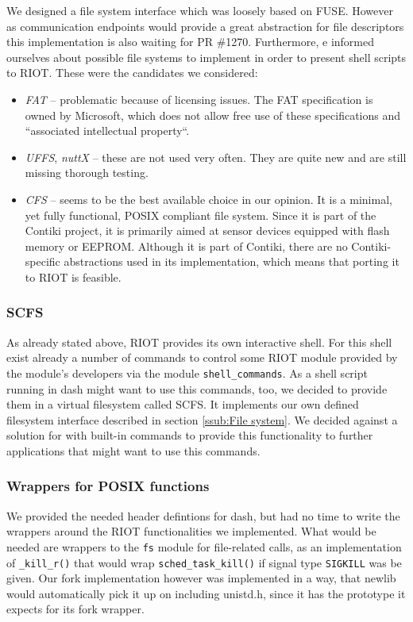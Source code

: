 \documentclass[conference]{IEEEtran}
\begin{document}
We designed a file system interface which was loosely based on
FUSE\cite{fuse}. However as communication endpoints would provide a great
abstraction for file descriptors this implementation is also waiting for
PR \#1270. Furthermore, e informed ourselves about possible file systems to
implement in order to present shell scripts to RIOT. These were the
candidates we considered:

\begin{itemize}
  \item \emph{FAT}\cite{fat} -- problematic because of licensing issues. The FAT
    specification is owned by Microsoft, which does not allow free use
    of these specifications and ``associated intellectual
    property``\cite{fatlicense}.
  \item \emph{UFFS}\cite{uffs}, \emph{nuttX}\cite{nuttx} -- these are
    not used very often. They are quite new and are still missing
    thorough testing.
  \item \emph{CFS}\cite{cfs} -- seems to be the best available choice in
    our opinion. It is a minimal, yet fully functional, POSIX compliant
    file system. Since it is part of the Contiki project\cite{contiki},
    it is primarily aimed at sensor devices equipped with flash memory
    or EEPROM. Although it is part of Contiki, there are no
    Contiki-specific abstractions used in its implementation, which
    means that porting it to RIOT is feasible.
\end{itemize}

\subsubsection{SCFS}
\label{ssub:SCFS}
As already stated above, RIOT provides its own interactive shell. For this
shell exist already a number of commands to control some RIOT module provided 
by the module's developers via the module \texttt{shell\_commands}. As a shell
script running in dash might want to use this commands, too, we decided to 
provide them in a virtual filesystem called SCFS. It implements our own defined
filesystem interface described in section \ref{ssub:File system}. We decided
against a solution for with built-in commands to provide this functionality
to further applications that might want to use this commands.

\subsubsection{Wrappers for POSIX functions}
\label{ssub:Wrappers for POSIX functions}
We provided the needed header defintions for dash, but had no time to write
the wrappers around the RIOT functionalities we implemented. What would be
needed are wrappers to the \texttt{fs} module for file-related calls, as an 
implementation of \texttt{\_kill\_r()} that would wrap
\texttt{sched\_task\_kill()} if signal type \texttt{SIGKILL} was be given.
Our fork implementation however was implemented in a way, that newlib would
automatically pick it up on including unistd.h, since it has the
prototype it expects for its fork wrapper.
\end{document}
